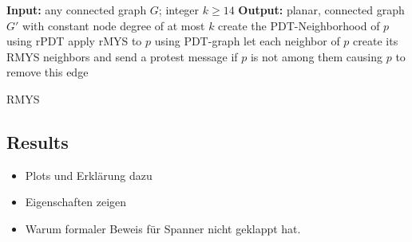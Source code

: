 \documentclass[compress]{beamer}
\begin{document}
\begin{frame}
\begin{algorithm}[H]
\begin{algorithmic}[0]
\STATE \textbf{Input:} any connected graph $G $; integer $k\geq 14 $
\STATE \textbf{Output:} planar, connected graph $G' $ with constant node degree of at most $k $
\STATE create the PDT-Neighborhood of $p $ using rPDT
\STATE apply rMYS to $p $ using PDT-graph
\STATE let each neighbor of $p $ create its RMYS neighbors and send a protest message if $p $ \indent is not among them causing $p $ to remove this edge
\ENDFOR
\end{algorithmic}
\caption{RMYS}
\end{algorithm}
\end{frame}


\subsection{Results}
\begin{frame}
\begin{itemize}
\item Plots und Erklärung dazu
\item Eigenschaften zeigen
\item Warum formaler Beweis für Spanner nicht geklappt hat.
\end{itemize}
\end{frame}
\end{document}

